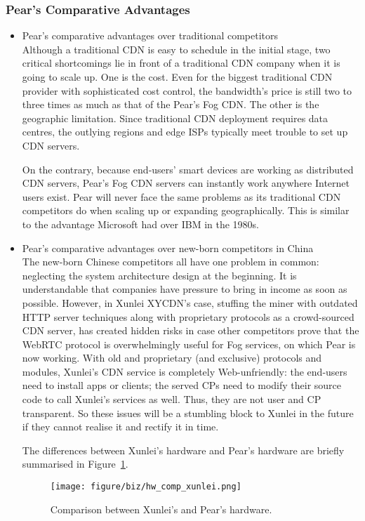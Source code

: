 \subsubsection{Pear's Comparative Advantages}
\begin{itemize}
	\item Pear's comparative advantages over traditional competitors\\
	Although a traditional CDN is easy to schedule in the initial stage, two critical shortcomings lie in front of a traditional CDN company when it is going to scale up. One is the cost. Even for the biggest traditional CDN provider with sophisticated cost control, the bandwidth's price is still two to three times as much as that of the Pear's Fog CDN. The other is the geographic limitation. Since traditional CDN deployment requires data centres, the outlying regions and edge ISPs typically meet trouble to set up CDN servers.
	
	On the contrary, because end-users' smart devices are working as distributed CDN servers, Pear's Fog CDN servers can instantly work anywhere Internet users exist. Pear will never face the same problems as its traditional CDN competitors do when scaling up or expanding geographically. This is similar to the advantage Microsoft had over  IBM in the 1980s. 
	
	\item Pear's comparative advantages over new-born competitors in China\\
	The new-born Chinese competitors all have one problem in common: neglecting the system architecture design at the beginning. It is understandable that companies have pressure to bring in income as soon as possible. However, in Xunlei XYCDN's case, stuffing the miner with outdated HTTP server techniques along with proprietary protocols as a crowd-sourced CDN server, has created hidden risks in case other competitors prove that the WebRTC protocol is overwhelmingly useful for Fog services, on which Pear is now working. With old and proprietary (and exclusive) protocols and modules, Xunlei's CDN service is completely Web-unfriendly: the end-users need to install apps or clients; the served CPs need to modify their source code to call Xunlei's services as well. Thus, they are not user and CP transparent. So these issues will be a stumbling block to Xunlei in the future if they cannot realise it and rectify it in time. 
	
	The differences between Xunlei's hardware and Pear's hardware are briefly summarised in Figure~\ref{fig:hw-comp-xunlei}.
	\begin{figure}[ht]
		\centering
		\texttt{[image: figure/biz/hw\_comp\_xunlei.png]}
		\caption{Comparison between Xunlei's and Pear's hardware.} \label{fig:hw-comp-xunlei}
	\end{figure}
	

\end{itemize}
